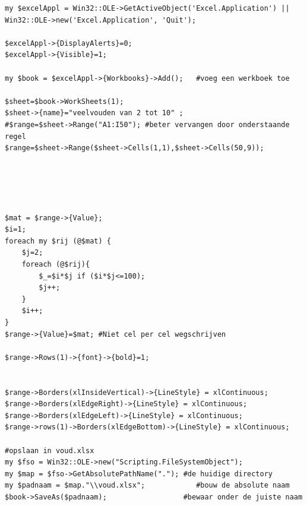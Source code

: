 \documentclass[11pt,a4paper]{report}
\begin{document}
\begin{enumerate}[resume]
\begin{lstlisting}
my $excelAppl = Win32::OLE->GetActiveObject('Excel.Application') || Win32::OLE->new('Excel.Application', 'Quit');

$excelAppl->{DisplayAlerts}=0;
$excelAppl->{Visible}=1;

my $book = $excelAppl->{Workbooks}->Add();   #voeg een werkboek toe

$sheet=$book->WorkSheets(1);
$sheet->{name}="veelvouden van 2 tot 10" ;
#$range=$sheet->Range("A1:I50"); #beter vervangen door onderstaande regel
$range=$sheet->Range($sheet->Cells(1,1),$sheet->Cells(50,9)); 





$mat = $range->{Value};
$i=1;
foreach my $rij (@$mat) {
	$j=2;
	foreach (@$rij){
		$_=$i*$j if ($i*$j<=100);
		$j++;
	}
	$i++;
}
$range->{Value}=$mat; #Niet cel per cel wegschrijven

$range->Rows(1)->{font}->{bold}=1;


$range->Borders(xlInsideVertical)->{LineStyle} = xlContinuous;
$range->Borders(xlEdgeRight)->{LineStyle} = xlContinuous;
$range->Borders(xlEdgeLeft)->{LineStyle} = xlContinuous;
$range->rows(1)->Borders(xlEdgeBottom)->{LineStyle} = xlContinuous;

#opslaan in voud.xlsx
my $fso = Win32::OLE->new("Scripting.FileSystemObject");
my $map = $fso->GetAbsolutePathName("."); #de huidige directory
my $padnaam = $map."\\voud.xlsx";            #bouw de absolute naam
$book->SaveAs($padnaam);                  #bewaar onder de juiste naam


\end{lstlisting}
\end{enumerate}
\end{document}
